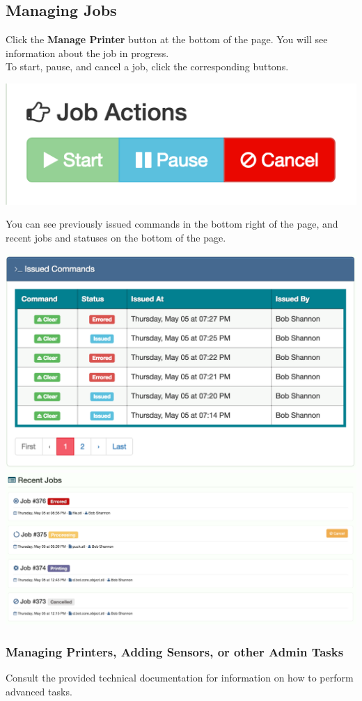   \subsection{Managing Jobs}
      Click the \textbf{Manage Printer} button at the bottom of the page.  You will see information about the job in progress.\\
      To start, pause, and cancel a job, click the corresponding buttons. 
      \begin{center}
      \includegraphics[scale=.5]{images/job-buttons.png}
    \end{center}
You can see previously issued commands in the bottom right of the page, and recent jobs and statuses on the bottom of the page.
      \begin{center}
      \includegraphics[scale=.4]{images/issued-commands.png}
      \includegraphics[scale=.3]{images/recent-jobs.png}
    \end{center}

  \subsubsection{Managing Printers, Adding Sensors, or other Admin Tasks}
      Consult the provided technical documentation for information on how to perform advanced tasks.

